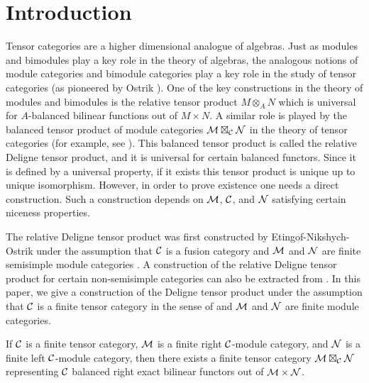 \documentclass{amsart}
\begin{document}
\tikzexternaldisable

\setcounter{tocdepth}{2}
\tableofcontents



\section{Introduction}

Tensor categories are a higher dimensional analogue of algebras.  Just as modules and bimodules play a key role in the theory of algebras, the analogous notions of module categories and bimodule categories play a key role in the study of tensor categories (as pioneered by Ostrik \cite{MR1976459}).  One of the key constructions in the theory of modules and bimodules is the relative tensor product $M \otimes_A N$ which is universal for $A$-balanced bilinear functions out of $M \times N$.   A similar role is played by the balanced tensor product of module categories $\mathcal M \boxtimes_\mathcal C \mathcal N$ in the theory of tensor categories (for example, see \cite{MR1966524, 0909.3140, MR2511638, MR2909758, 1202.4396, MR3022755, MR3063919}).  This balanced tensor product is called the relative Deligne tensor product, and it is universal for certain balanced functors.  Since it is defined by a universal property, if it exists this tensor product is unique up to unique isomorphism.  However, in order to prove existence one needs a direct construction.  Such a construction depends on $\mathcal M$, $\mathcal C$, and $\mathcal N$ satisfying certain niceness properties.  

The relative Deligne tensor product was first constructed by Etingof-Nikshych-Ostrik under the assumption that $\mathcal C$ is a fusion category and $\mathcal M$ and $\mathcal N$ are finite semisimple module categories \cite{0909.3140}.  A construction of the relative Deligne tensor product for certain non-semisimple categories can also be extracted from \cite[Thm 3.1]{1102.3411}.   In this paper, we give a construction of the Deligne tensor product under the assumption that $\mathcal C$ is a finite tensor category in the sense of \cite{EO-ftc} and $\mathcal M$ and $\mathcal N$ are finite module categories.  

\begin{theorem}
If $\mathcal C$ is a finite tensor category, $\mathcal M$ is a finite right $\mathcal C$-module category, and $\mathcal N$ is a finite left $\mathcal C$-module category, then there exists a finite tensor category $\mathcal M \boxtimes_\mathcal C \mathcal N$ representing $\mathcal C$ balanced right exact bilinear functors out of $\mathcal M \times \mathcal N$.
\end{theorem}
\end{document}
